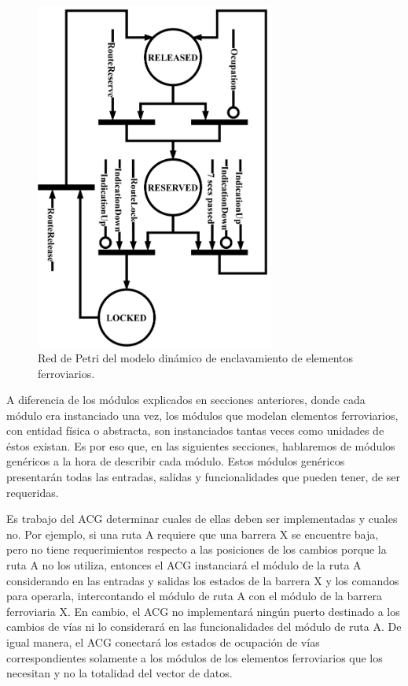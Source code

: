 \begin{figure}[H]
	\centering
	\includegraphics[width=0.7\textwidth]{Figuras/INT_petri}
	\centering\caption{Red de Petri del modelo dinámico de enclavamiento de elementos ferroviarios.}
	\label{fig:Interlocking_petri}
\end{figure}


A diferencia de los módulos explicados en secciones anteriores, donde cada módulo era instanciado una vez, los módulos que modelan elementos ferroviarios, con entidad física o abstracta, son instanciados tantas veces como unidades de éstos existan. Es por eso que, en las siguientes secciones, hablaremos de módulos genéricos a la hora de describir cada módulo. Estos módulos genéricos presentarán todas las entradas, salidas y funcionalidades que pueden tener, de ser requeridas. 

Es trabajo del ACG determinar cuales de ellas deben ser implementadas y cuales no. Por ejemplo, si una ruta A requiere que una barrera X se encuentre baja, pero no tiene requerimientos respecto a las posiciones de los cambios porque la ruta A no los utiliza, entonces el ACG instanciará el módulo de la ruta A considerando en las entradas y salidas los estados de la barrera X y los comandos para operarla, intercontando el módulo de ruta A con el módulo de la barrera ferroviaria X. En cambio, el ACG no implementará ningún puerto destinado a los cambios de vías ni lo considerará en las funcionalidades del módulo de ruta A. De igual manera, el ACG conectará los estados de ocupación de vías correspondientes solamente a los módulos de los elementos ferroviarios que los necesitan y no la totalidad del vector de datos.







